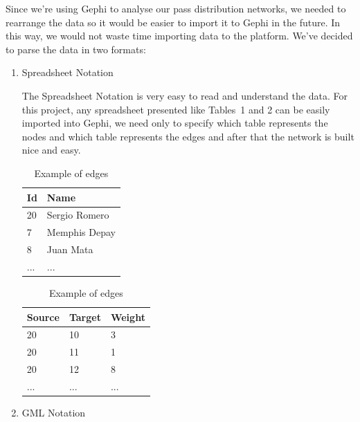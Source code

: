 \documentclass[12pt]{article}
\begin{document}
Since we're using Gephi to analyse our pass distribution networks, we needed to rearrange the data so it would be easier to import it to Gephi in the future. In this way, we would not waste time importing data to the platform. We've decided to parse the data in two formats:
\begin{enumerate}
	\item{Spreadsheet Notation}
	
The Spreadsheet Notation is very easy to read and understand the data. For this project, any spreadsheet presented like  Tables~1 and 2 can be easily imported into Gephi, we need only to specify which table represents the nodes and which table represents the edges and after that the network is built nice and easy. 
\begin{table}[H]\label{tab:Spreadsheet}
	\begin{minipage}{.5\linewidth}
	\centering
		\begin{tabular}{l|l}
			Id  & Name          \\
			\hline
			20  & Sergio Romero \\
			7   & Memphis Depay \\
			8   & Juan Mata     \\
			... & ...          
		\end{tabular}
	\caption{Example of nodes}
	\end{minipage}
	\begin{minipage}{.5\linewidth}
		\centering
		\begin{tabular}{l|l|l}
			Source & Target & Weight \\
			\hline
			20     & 10     & 3      \\
			20     & 11     & 1      \\
			20     & 12     & 8      \\
			...    & ...    & ...   		
		\end{tabular}
	\caption{Example of edges}
	\end{minipage}
\end{table}	
\pagebreak
	\item{GML Notation}
	

\end{enumerate}
\end{document}

